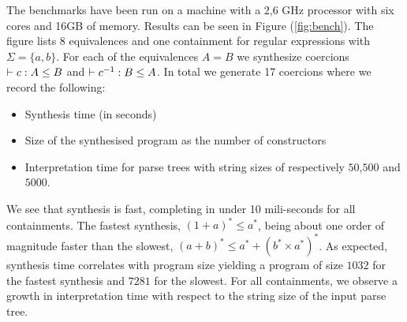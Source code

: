 The benchmarks have been run on a machine with a 2,6 GHz processor with six cores and 16GB of memory. Results can be seen in Figure (\ref{fig:bench}). The figure lists 8 equivalences and one containment for regular expressions with $\Sigma= \{a,b\}$. For each of the equivalences $A = B$ we synthesize coercions $\contains{}{c}{A}{B}$ and $\contains{}{\dslcominv{c}}{B}{A}$. In total we generate 17 coercions where we record the following:
\begin{itemize}
\item Synthesis time (in seconds)
\item Size of the synthesised program as the number of constructors 
\item Interpretation time for parse trees with string sizes of respectively $50$,$500$ and $5000$.
\end{itemize}
We see that synthesis is fast, completing in under 10 mili-seconds for all containments. The fastest synthesis, $(1 + a)^* \leq a^*$, being about one order of magnitude faster than the slowest, $(a + b)^* \leq a^* + (b^* \times a^*)^*$. As expected, synthesis time correlates with program size yielding a program of size $1032$ for the fastest synthesis and $7281$ for the slowest. For all containments, we observe a growth in interpretation time with respect to the string size of the input parse tree.
